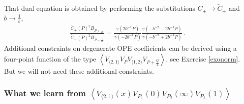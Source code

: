 \documentclass[12pt, a4paper, notitlepage, twoside]{report}
\numberwithin{equation}{section}
\theoremstyle{break}
\begin{document}
 That dual equation is obtained by performing 
 the substitutions $C_\pm \to \tilde{C}_\pm$ and $b\to \frac{1}{b}$,
 \begin{align}
 \frac{\tilde{C}_+(P)^2B_{P+\tfrac{1}{2b}}}{\tilde{C}_-(P)^2 B_{P-\tfrac{1}{2b}}}
 =  \frac{\gamma(2b^{-1}P)}{\gamma(-2b^{-1}P)}
 \frac{\gamma(-b^{-2}-2b^{-1}P)}{\gamma(-b^{-2}+2b^{-1}P)} \ .
\end{align}
Additional constraints on degenerate OPE coefficients can be derived using a four-point function of the type $
 \left\langle V_{\langle 2,1\rangle} V_P V_{\langle 1, 2\rangle} V_{P+\frac{Q}{2}}\right\rangle$, see
Exercise \ref{exonorm}. But we will not need these additional constraints.

\subsubsection{What we learn from $\left\langle V_{\langle 2,1 \rangle}(x)V_{P_1}(0)V_{P_2}(\infty)V_{P_3}(1)\right\rangle$}
\end{document}
